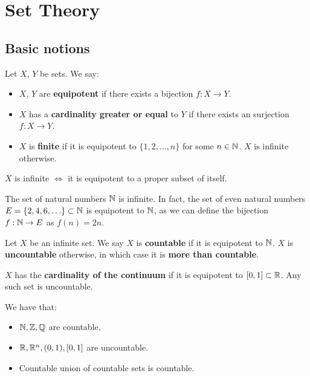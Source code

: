 \chapter{Set Theory}

\section{Basic notions}

\begin{fdefinition}
    Let $X$, $Y$ be sets. We say:
    \begin{itemize}
        \item $X$, $Y$ are \textbf{equipotent} if there exists a bijection
        $f: X \to Y$.

        \item $X$ has a \textbf{cardinality greater or equal} to $Y$ if there exists an
        surjection $f: X \to Y$.

        \item $X$ is \textbf{finite} if it is equipotent to $\{1, 2, \ldots, n\}$
        for some $n \in \mathbb{N}$. $X$ is infinite otherwise.
    \end{itemize}

\end{fdefinition}

\begin{fremark}
    $X$ is infinite $\iff$ it is equipotent to a proper subset of itself.
\end{fremark}

\begin{example}
    The set of natural numbers $\mathbb{N}$ is infinite. In fact, the set of even
    natural numbers $E = \{2, 4, 6, \ldots\} \subset \mathbb{N}$ is equipotent to $\mathbb{N}$, 
    as we can define the bijection $f: \mathbb{N} \to E$ as $f(n) = 2n$.
\end{example}

\begin{fdefinition}
    Let $X$ be an infinite set. We say $X$ is \textbf{countable} if it is
    equipotent to $\mathbb{N}$. $X$ is \textbf{uncountable} otherwise, in which case
    it is \textbf{more than countable}.
\end{fdefinition}

\begin{fdefinition}
    $X$ has the \textbf{cardinality of the continuum} if it is equipotent to
    $[0, 1] \subset \mathbb{R}$. Any such set is uncountable.
\end{fdefinition}

\begin{example}
    We have that:
    \begin{itemize}
        \item $\mathbb{N}, \mathbb{Z}, \mathbb{Q}$ are countable.
        \item $\mathbb{R}, \mathbb{R}^n, (0, 1), [0, 1]$ are uncountable.
        \item Countable union of countable sets is countable.
    \end{itemize}
\end{example}

